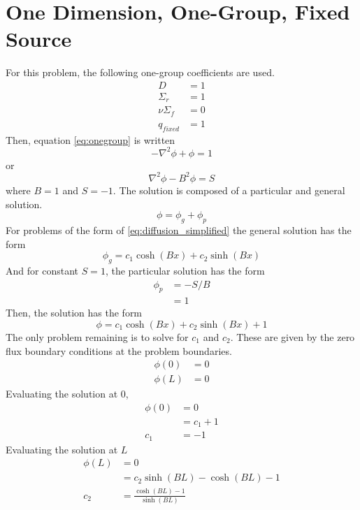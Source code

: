 \documentclass{article}
\begin{document}
\section{One Dimension, One-Group, Fixed Source}
  For this problem, the following one-group coefficients are used.
  \begin{align*}
    D &= 1\\
    \Sigma_r &= 1\\
    \nu \Sigma_f &= 0\\
    q_{fixed} &= 1
  \end{align*}
  Then, equation \eqref{eq:onegroup} is written
  \begin{equation}
    - \nabla^2 \phi + \phi = 1 
  \end{equation}
  or
  \begin{equation} \label{eq:diffusion_simplified}
    \nabla^2 \phi - B^2 \phi = S
  \end{equation}
  where $B = 1$ and $S=-1$.
  The solution is composed of a particular and general solution.
  \begin{equation}
    \phi = \phi_g + \phi_p 
  \end{equation}
  For problems of the form of \eqref{eq:diffusion_simplified} the general 
  solution has the form
  \begin{equation} \label{eq:general}
    \phi_g = c_1 \cosh(Bx) + c_2 \sinh(Bx)
  \end{equation}
  And for constant $S=1$, the particular solution has the form
  \begin{align} \label{eq:particular}
    \phi_p &= -S/B \\
    \nonumber &= 1
  \end{align}
  Then, the solution has the form
  \begin{equation} 
    \phi = c_1 \cosh(Bx) + c_2 \sinh(Bx) + 1
  \end{equation}
  The only problem remaining is to solve for $c_1$ and $c_2$. These are given
  by the zero flux boundary conditions at the problem boundaries.
  \begin{align}
    \phi(0) &= 0\\
    \phi(L) &= 0
  \end{align}
  Evaluating the solution at 0, 
  \begin{align}
    \phi(0) &= 0 \\
    &= c_1 + 1\\
    c_1 &= -1
  \end{align}
  Evaluating the solution at $L$
  \begin{align}
    \phi(L) &= 0\\
    &= c_2 \sinh(BL) - \cosh(BL)-1\\
    c_2 &= \frac{\cosh(BL)-1}{\sinh(BL)}
  \end{align}
\end{document}
